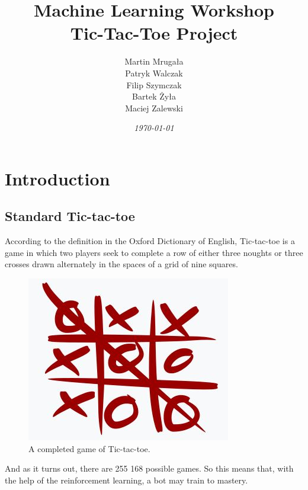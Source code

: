 \documentclass[a4paper,12pt]{book}
\begin{document}
	
	\author{Martin Mrugała\\Patryk Walczak\\Filip Szymczak\\Bartek Żyła\\Maciej Zalewski}
	\title{\Huge{\bf{Machine Learning Workshop\\Tic-Tac-Toe Project}}}
	\date{\emph{\today}}
	
	\frontmatter
	\maketitle

	\tableofcontents
	
	\mainmatter
	\chapter{Introduction}
	\section{Standard Tic-tac-toe}
	According to the definition in the Oxford Dictionary of English, Tic-tac-toe is a game in which two players seek to complete a row of either three noughts or three crosses drawn alternately in the spaces of a grid of nine squares.
		\begin{figure}[!h]
		\includegraphics{./Images/1.jpg}
		\centering
		\caption{A completed game of Tic-tac-toe\protect\footnotemark.}
		\label{fig:Capture1}
	\end{figure}
	And as it turns out, there are 255 168 possible games. So this means that, with the help of the reinforcement learning, a bot may train to mastery. 
	\newpage
\end{document}
